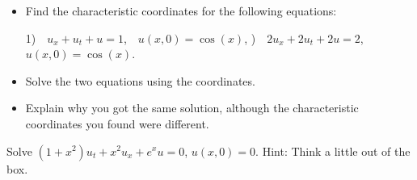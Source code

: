 \documentclass{ximera}
\begin{document}
\begin{exercise}
    \begin{itemize}
        \item Find the characteristic coordinates for the following equations:
        
            1)~~$u_x+u_t + u = 1$,~~$u(x,0) = \cos(x)$,
            )~~$2u_x+2u_t +2u = 2$,~~$u(x,0) = \cos(x)$.
        \item Solve the two equations using the coordinates.
        \item Explain why you got the same solution, although the characteristic coordinates you found were different.
    \end{itemize}
\end{exercise}

\begin{exercise}
    Solve $(1+x^2) u_t + x^2 u_x + e^x u = 0$, $u(x,0) = 0$. Hint: Think a little out of the box.
\end{exercise}

\end{document}
